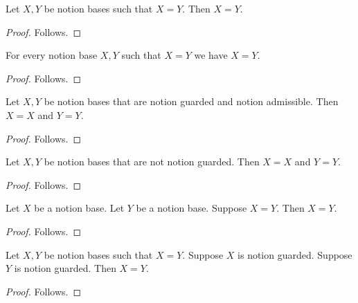 

\begin{proposition}\label{notion_grouped_ordinary}
    Let $X,Y$ be notion bases such that $X=Y$.
    Then $X=Y$.
\end{proposition}
\begin{proof}
    Follows.
\end{proof}

\begin{proposition}\label{notion_grouped_universal}
    For every notion base $X,Y$ such that $X=Y$ we have $X=Y$.
\end{proposition}
\begin{proof}
    Follows.
\end{proof}

\begin{proposition}\label{notion_grouped_plural_attributes}
    Let $X,Y$ be notion bases that are notion guarded and notion admissible.
    Then $X=X$ and $Y=Y$.
\end{proposition}
\begin{proof}
    Follows.
\end{proof}

\begin{proposition}\label{notion_grouped_plural_negative_attribute}
    Let $X,Y$ be notion bases that are not notion guarded.
    Then $X=X$ and $Y=Y$.
\end{proposition}
\begin{proof}
    Follows.
\end{proof}

\begin{proposition}\label{notion_repeated_ordinary}
    Let $X$ be a notion base.
    Let $Y$ be a notion base.
    Suppose $X=Y$.
    Then $X=Y$.
\end{proposition}
\begin{proof}
    Follows.
\end{proof}

\begin{proposition}\label{notion_grouped_later_headers}
    Let $X,Y$ be notion bases such that $X=Y$.
    Suppose $X$ is notion guarded.
    Suppose $Y$ is notion guarded.
    Then $X=Y$.
\end{proposition}
\begin{proof}
    Follows.
\end{proof}
